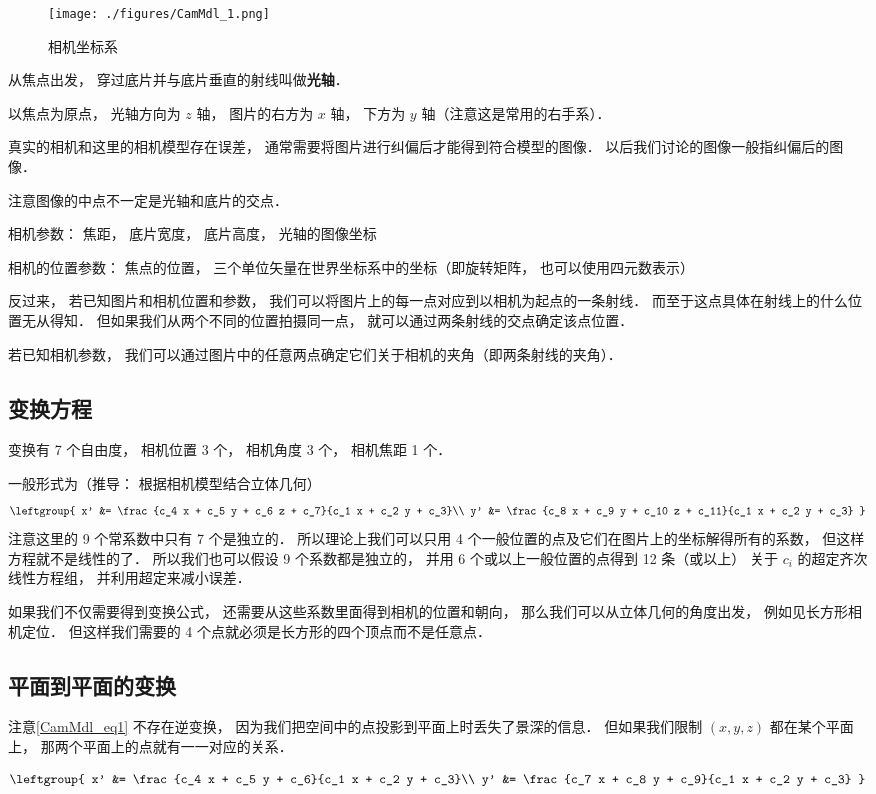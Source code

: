 
\begin{figure}[ht]
\centering
\texttt{[image: ./figures/CamMdl\_1.png]}
\caption{相机坐标系} \label{CamMdl_fig1}
\end{figure}

从焦点出发， 穿过底片并与底片垂直的射线叫做\textbf{光轴}．

以焦点为原点， 光轴方向为 $z$ 轴， 图片的右方为 $x$ 轴， 下方为 $y$ 轴（注意这是常用的右手系）．

真实的相机和这里的相机模型存在误差， 通常需要将图片进行纠偏后才能得到符合模型的图像． 以后我们讨论的图像一般指纠偏后的图像．

注意图像的中点不一定是光轴和底片的交点．

相机参数： 焦距， 底片宽度， 底片高度， 光轴的图像坐标

相机的位置参数： 焦点的位置， 三个单位矢量在世界坐标系中的坐标（即旋转矩阵， 也可以使用四元数表示）

反过来， 若已知图片和相机位置和参数， 我们可以将图片上的每一点对应到以相机为起点的一条射线． 而至于这点具体在射线上的什么位置无从得知． 但如果我们从两个不同的位置拍摄同一点， 就可以通过两条射线的交点确定该点位置．

若已知相机参数， 我们可以通过图片中的任意两点确定它们关于相机的夹角（即两条射线的夹角）．

\subsection{变换方程}
变换有 7 个自由度， 相机位置 3 个， 相机角度 3 个， 相机焦距 1 个．

一般形式为（推导： 根据相机模型结合立体几何）
\begin{equation}\label{CamMdl_eq1}
\leftgroup{
x' &= \frac{c_4 x + c_5 y + c_6 z + c_7}{c_1 x + c_2 y + c_3}\\
y' &= \frac{c_8 x + c_9 y + c_10 z + c_11}{c_1 x + c_2 y + c_3}
}
\end{equation}
注意这里的 9 个常系数中只有 7 个是独立的． 所以理论上我们可以只用 4 个一般位置的点及它们在图片上的坐标解得所有的系数， 但这样方程就不是线性的了． 所以我们也可以假设 9 个系数都是独立的， 并用 6 个或以上一般位置的点得到 12 条（或以上） 关于 $c_i$ 的超定齐次线性方程组， 并利用超定来减小误差．

如果我们不仅需要得到变换公式， 还需要从这些系数里面得到相机的位置和朝向， 那么我们可以从立体几何的角度出发， 例如见长方形相机定位． 但这样我们需要的 4 个点就必须是长方形的四个顶点而不是任意点．

\subsection{平面到平面的变换}
注意\autoref{CamMdl_eq1} 不存在逆变换， 因为我们把空间中的点投影到平面上时丢失了景深的信息． 但如果我们限制 $(x, y, z)$ 都在某个平面上， 那两个平面上的点就有一一对应的关系．

\begin{equation}
\leftgroup{
x' &= \frac{c_4 x + c_5 y + c_6}{c_1 x + c_2 y + c_3}\\
y' &= \frac{c_7 x + c_8 y + c_9}{c_1 x + c_2 y + c_3}
}
\end{equation}
